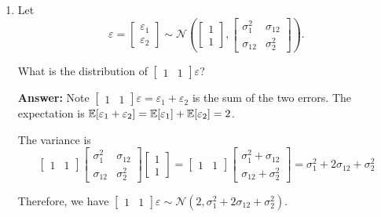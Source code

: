 \documentclass[12pt]{article}
\newcommand{\answer}[1]{{\color{blue_winged_teal}\textbf{Answer:} #1}}
\begin{document}
\begin{enumerate}
  \answer{
    A and b; B and a; C and c. You can verify these by doing e.g. $Ab = bA = I$.
  }


  \bigskip\bigskip
  \item Let $$
    \varepsilon = \begin{bmatrix}\varepsilon_1 \\ \varepsilon_2\end{bmatrix} \sim \mathcal{N}\left( \begin{bmatrix}1 \\ 1\end{bmatrix}, \begin{bmatrix}\sigma_1^2 & \sigma_{12} \\ \sigma_{12} & \sigma_2^2\end{bmatrix} \right).
  $$

  What is the distribution of $\begin{bmatrix} 1 & 1 \end{bmatrix} \varepsilon$?

  \answer{
    Note $\begin{bmatrix} 1 & 1 \end{bmatrix} \varepsilon = \varepsilon_1 + \varepsilon_2$ is the sum of the two errors. The expectation is $\expec{\varepsilon_1 + \varepsilon_2} = \expec{\varepsilon_1} + \expec{\varepsilon_2} = 2$.

    The variance is
    $$
      \begin{bmatrix} 1 & 1 \end{bmatrix}
      \begin{bmatrix}\sigma_1^2 & \sigma_{12} \\ \sigma_{12} & \sigma_2^2\end{bmatrix}
      \begin{bmatrix} 1 \\ 1 \end{bmatrix} =
      \begin{bmatrix} 1 & 1 \end{bmatrix}
      \begin{bmatrix}\sigma_1^2 + \sigma_{12} \\ \sigma_{12} + \sigma_2^2\end{bmatrix} = \sigma_1^2 + 2\sigma_{12} + \sigma_2^2
    $$

    Therefore, we have $\begin{bmatrix} 1 & 1 \end{bmatrix} \varepsilon \sim \mathcal{N}(2, \sigma_1^2 + 2\sigma_{12} + \sigma_2^2)$.
  }


\end{enumerate}
\end{document}
